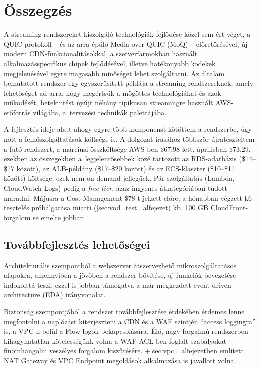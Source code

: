 \chapter{Összegzés}

A streaming rendszereket kiszolgáló technológiák fejlődése közel sem ért véget, a QUIC protokoll -- és az arra épülő Media over QUIC\cite{ietf-moq-transport-11} (MoQ) -- előretörésével, új modern CDN-funkcionalitásokkal\cite{openconnect}, a szerverfarmokban használt alkalmazásspecifikus chipek fejlődésével, illetve hatékonyabb kodekek megjelenésével egyre magasabb minőséget lehet szolgáltatni. Az általam bemutatott rendszer egy egyszerűsített példája a streaming rendszereknek, amely lehetőséget ad arra, hogy megértsük a mögöttes technológiákat és azok működését, betekintést nyújt néhány tipikusan streamingre használt AWS-erőforrás világába, a~tervezési technikák palettájába.

A fejlesztés ideje alatt ahogy egyre több komponenst kötöttem a rendszerbe, úgy nőtt a felhőszolgáltatások költsége is. A dolgozat írásához többször újrateszteltem a futó rendszert, a márciusi összköltsége AWS-ben \$67.98 lett, áprilisban \$73.29, ezekben az összegekben a~legjelentősebbek közé tartozott az RDS-adatbázis (\$14--\$17 között), az ALB-példány (\$17--\$20 között) és az ECS-klaszter (\$10--\$11 között) költsége, ezek nem on-demand jellegűek. Pár szolgáltatás (Lambda, CloudWatch Logs) pedig a \emph{free tier}, azaz ingyenes átkategóriában tudott maradni. Májusra a Cost Management \$78-t jelzett előre, a hónapban végzett k6 tesztelés próbálgatása miatti (\ref{sec:vod_test}. alfejezet) kb. 100 GB CloudFront-forgalom se emelte jobban.

\section{Továbbfejlesztés lehetőségei}

Architekturális szempontból a webszerver átszervezhető mikroszolgáltatásos alapokra, amennyiben a jövőben a rendszer bővítése, új funkciók bevezetése indokolttá teszi, ezzel is jobban támogatva a már megkezdett event-driven architecture (EDA)\cite{eda} irányvonalat.

Biztonság szempontjából a rendszer továbbfejlesztése érdekében érdemes lenne megfontolni a naplózást kiterjeszteni a CDN és a WAF szintjén ``access loggingra'' is, a VPC-n belül a Flow logok bekapcsolására. Élő, nagy forgalmú rendszerben kihagyhatatlan kötelességünk volna a WAF ACL-ben foglalt szabályokat finomhangolni veszélyes forgalom kiszűrésére. \Az+\ref{sec:vpc}.~alfejezetben említett NAT Gateway és VPC Endpoint megoldások alkalmazása is javallott volna.

